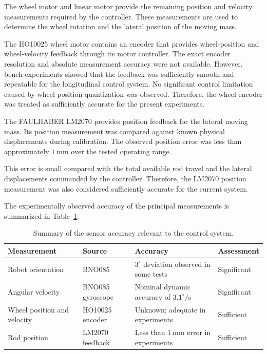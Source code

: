 The wheel motor and linear motor provide the remaining position and velocity measurements required by the controller. These measurements are used to determine the wheel rotation and the lateral position of the moving mass.

The HO10025 wheel motor contains an encoder that provides wheel-position and wheel-velocity feedback through its motor controller. The exact encoder resolution and absolute measurement accuracy were not available. However, bench experiments showed that the feedback was sufficiently smooth and repeatable for the longitudinal control system. No significant control limitation caused by wheel-position quantization was observed. Therefore, the wheel encoder was treated as sufficiently accurate for the present experiments.

The FAULHABER LM2070 provides position feedback for the lateral moving mass. Its position measurement was compared against known physical displacements during calibration. The observed position error was less than approximately $1~\mathrm{mm}$ over the tested operating range.

This error is small compared with the total available rod travel and the lateral displacements commanded by the controller. Therefore, the LM2070 position measurement was also considered sufficiently accurate for the current system.

The experimentally observed accuracy of the principal measurements is summarized in Table~\ref{tab:sensor-accuracy-summary}.

\begin{table}[htbp]
  \centering
  \small
  \renewcommand{\arraystretch}{1.3}
  \caption{Summary of the sensor accuracy relevant to the control system.}
  \label{tab:sensor-accuracy-summary}
  \begin{tabular}{
    p{}
    p{}
    p{}
    p{}
  }
    \hline
    \textbf{Measurement}
    &
    \textbf{Source}
    &
    \textbf{Accuracy}
    &
    \textbf{Assessment}
    \\
    \hline

    Robot orientation
    &
    BNO085
    &
    $3^\circ$ deviation observed in some tests
    &
    Significant
    \\

    Angular velocity
    &
    BNO085 gyroscope
    &
    Nominal dynamic accuracy of $3.1^\circ/\mathrm{s}$
    &
    Significant
    \\

    Wheel position and velocity
    &
    HO10025 encoder
    &
    Unknown; adequate in experiments
    &
    Sufficient
    \\

    Rod position
    &
    LM2070 feedback
    &
    Less than $1~\mathrm{mm}$ error in experiments
    &
    Sufficient
    \\

    \hline
  \end{tabular}
\end{table}

